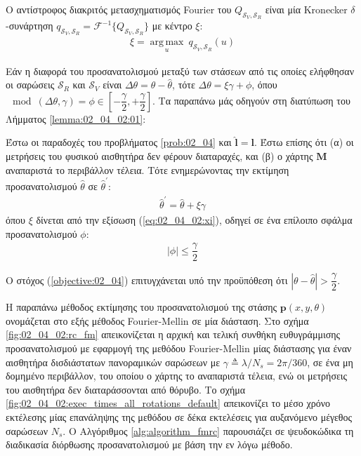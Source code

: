 Ο αντίστροφος διακριτός μετασχηματισμός Fourier του
$Q_{\mathcal{S}_V, \mathcal{S}_R}$ είναι μία Kronecker $\delta$-συνάρτηση
$q_{\mathcal{S}_V, \mathcal{S}_R} = \mathcal{F}^{-1}\{Q_{\mathcal{S}_V, \mathcal{S}_R}\}$
με κέντρο $\xi$:
\begin{align}
  \xi = \operatorname*{arg\,max}\limits_u \ q_{\mathcal{S}_V, \mathcal{S}_R}(u)
  \label{eq:02_04_02:xi}
\end{align}

Εάν η διαφορά του προσανατολισμού μεταξύ των στάσεων από τις οποίες ελήφθησαν
οι σαρώσεις $\mathcal{S}_R$ και $\mathcal{S}_V$ είναι
$\Delta\theta = \theta - \hat{\theta}$, τότε
$\Delta\theta = \xi\gamma + \phi$, όπου
$\mod(\Delta\theta, \gamma) = \phi \in [-\dfrac{\gamma}{2},+\dfrac{\gamma}{2}]$.
Τα παραπάνω μάς οδηγούν στη διατύπωση του Λήμματος \ref{lemma:02_04_02:01}:

\begin{lemma}
  \label{lemma:02_04_02:01}
  Έστω οι παραδοχές του προβλήματος \ref{prob:02_04} και $\hat{\bm{l}} = \bm{l}$.
  Έστω επίσης ότι (α) οι μετρήσεις του φυσικού αισθητήρα δεν φέρουν
  διαταραχές, και (β) ο χάρτης $\bm{M}$ αναπαριστά το περιβάλλον τέλεια.
  Τότε ενημερώνοντας την εκτίμηση προσανατολισμού $\hat{\theta}$ σε
  $\hat{\theta}^\prime$:
  \begin{align}
    \hat{\theta}^\prime = \hat{\theta} + \xi \gamma \label{eq:update_t1}
  \end{align}
  όπου $\xi$ δίνεται από την εξίσωση (\ref{eq:02_04_02:xi}),
  οδηγεί σε ένα επίλοιπο σφάλμα προσανατολισμού $\phi$:
  \begin{align}
    |\phi| \leq \dfrac{\gamma}{2}  \label{eq:phi_1}
  \end{align}
\end{lemma}

\begin{corollary}
  Ο στόχος (\ref{objective:02_04}) επιτυγχάνεται υπό την προϋπόθεση ότι
  $|\theta-\hat{\theta}| > \dfrac{\gamma}{2}$.
\end{corollary}

Η παραπάνω μέθοδος εκτίμησης του προσανατολισμού της στάσης
$\bm{p}(x,y,\theta)$ ονομάζεται στο εξής μέθοδος Fourier-Mellin σε μία
διάσταση. Στο σχήμα \ref{fig:02_04_02:rc_fm} απεικονίζεται η αρχική και τελική
συνθήκη ευθυγράμμισης προσανατολισμού με εφαρμογή της μεθόδου Fourier-Mellin
μίας διάστασης για έναν αισθητήρα δισδιάστατων πανοραμικών σαρώσεων με $\gamma
\triangleq \lambda / N_s = 2\pi/360$, σε ένα μη δομημένο περιβάλλον, του οποίου ο
χάρτης το αναπαριστά τέλεια, ενώ οι μετρήσεις του αισθητήρα δεν διαταράσσονται
από θόρυβο. Το σχήμα \ref{fig:02_04_02:exec_times_all_rotations_default}
απεικονίζει το μέσο χρόνο εκτέλεσης μίας επανάληψης της μεθόδου σε δέκα
εκτελέσεις για αυξανόμενο μέγεθος σαρώσεων $N_s$.  Ο Αλγόριθμος
\ref{alg:algorithm_fmrc} παρουσιάζει σε ψευδοκώδικα τη διαδικασία διόρθωσης
προσανατολισμού με βάση την εν λόγω μέθοδο.

